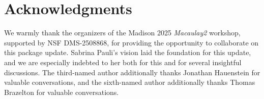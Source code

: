 \documentclass[12pt]{amsart}
\theoremstyle{definition}
\begin{document}
\section{Acknowledgments}\label{sec: acknowledgments}

We warmly thank the organizers of the Madison 2025 \emph{Macaulay2} workshop, supported by NSF DMS-2508868, for providing the opportunity to collaborate on this package update. Sabrina Pauli's vision laid the foundation for this update, and we are especially indebted to her both for this and for several insightful discussions. The third-named author additionally thanks Jonathan Hauenstein for valuable conversations, and the sixth-named author additionally thanks Thomas Brazelton for valuable conversations. 



\end{document}
